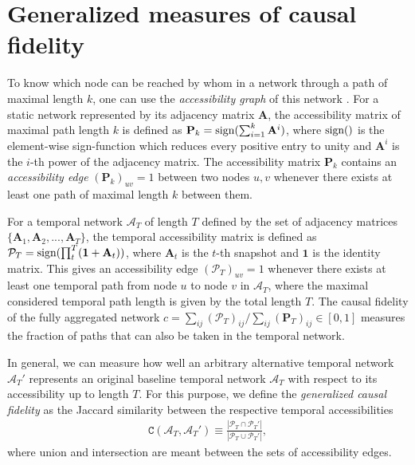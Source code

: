 \documentclass[%
 reprint,
 amsmath,amssymb,
 aps,
]{revtex4-2}
\begin{document}
\section{\label{sec:theory}Generalized measures of causal fidelity}
To know which node can be reached by whom in a network through a path of maximal length $k$, one can use the \textit{accessibility graph} of this network \cite{lentz2013unfolding}.  For a static network represented by its adjacency matrix ${\mathbf{A}}$, the accessibility matrix of maximal path length $k$ is defined as  
$\mathbf{P}_k = \hbox{sign}(\sum_{i=1}^{k} {\mathbf{A}}^i)$,
where $\hbox{sign}()$ is the element-wise sign-function which reduces every positive entry to unity and ${\mathbf{A}}^i$ is the $i$-th power of the adjacency matrix. 
The accessibility matrix $\mathbf{P}_k$ contains an \textit{accessibility edge} $(\mathbf{P}_{k})_{uv}=1$ between two nodes $u,v$  whenever there exists at least one path of maximal length $k$ between them.

For a temporal network $\mathcal{A}_T$ of length $T$ defined by the set of adjacency matrices $\{ \mathbf{A}_{1}, \mathbf{A}_{2}, ..., \mathbf{A}_{T}\}$, the temporal accessibility matrix is defined as \cite{lentz2013unfolding}
$\mathcal{P}_T = \hbox{sign}(\prod_t^{T} (\mathbf{1} + \mathbf{A}_{t}))$,
where 
$\mathbf{A}_{t}$ is the $t$-th snapshot and $\mathbf{1}$ is the identity matrix. This gives an accessibility edge $(\mathcal{P}_{T})_{uv}=1$ whenever there exists at least one temporal path from node $u$ to node $v$ in $\mathcal{A}_T$, where the maximal considered temporal path length is given by the total length $T$.
The causal fidelity of the fully aggregated network $c=\sum_{ij}(\mathcal{P}_T)_{ij}/\sum_{ij} (\mathbf{P}_T)_{ij} \in [0,1]$ measures the fraction of paths that can also be taken in the temporal network.

In general, we can measure how well an arbitrary alternative temporal network $\mathcal{A}_T'$ represents an original  baseline temporal network $\mathcal{A}_T$ with respect to its accessibility up to length $T$. For this purpose, we define the \textit{generalized causal fidelity} as the Jaccard similarity between the respective temporal accessibilities
\begin{align}
\mathtt{C}(\mathcal{A}_T,\mathcal{A}_T')
\equiv
\frac{|\mathcal{P}_T \cap \mathcal{P}_T'|}{|\mathcal{P}_T \cup \mathcal{P}_T'|},
\label{gcf1}
\end{align}
where union and intersection are meant between the sets of accessibility edges. 
\end{document}
